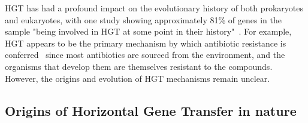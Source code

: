 \documentclass[PhD]{msu-thesis}
\begin{document}

HGT has had a profound impact on the evolutionary history of both prokaryotes and eukaryotes, with one study showing approximately 81\% of genes in the sample "being involved in HGT at some point in their history"~\cite{dagan_modular_2008}. For example, HGT appears to be the primary mechanism by which antibiotic resistance is conferred~\cite{davies_origins_1997,martinez_antibiotics_2008} since most antibiotics are sourced from the environment, and the organisms that develop them are themselves resistant to the compounds.
However, the origins and evolution of HGT mechanisms remain unclear. 

\subsection{Origins of Horizontal Gene Transfer in nature}
\end{document}
